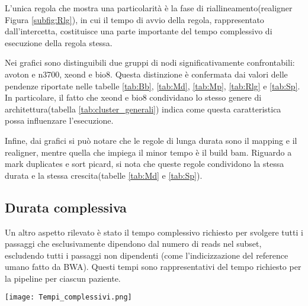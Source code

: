 L'unica regola che mostra una particolarità è la fase di riallineamento(realigner Figura \ref{subfig:Rlg}), in cui il tempo di avvio della regola, rappresentato dall'intercetta, costituisce una parte importante del tempo complessivo di esecuzione della regola stessa. 

Nei grafici sono distinguibili due gruppi di nodi significativamente confrontabili: avoton e n3700, xeond e bio8.
Questa distinzione è confermata dai valori delle pendenze riportate nelle tabelle \ref{tab:Bb}, \ref{tab:Md}, \ref{tab:Mp}, \ref{tab:Rlg} e \ref{tab:Sp}.
In particolare, il fatto che xeond e bio8 condividano lo stesso genere di architettura(tabella \ref{tab:cluster_generali}) indica come questa caratteristica possa influenzare l'esecuzione.

Infine, dai grafici si può notare che le regole di lunga durata sono il mapping e il realigner, mentre quella che impiega il minor tempo è il build bam.
Riguardo a mark duplicates e sort picard, si nota che queste regole condividono la stessa durata e la stessa crescita(tabelle \ref{tab:Md} e \ref{tab:Sp}).    


\subsection{Durata complessiva}
Un altro aspetto rilevato è stato il tempo complessivo richiesto per svolgere tutti i passaggi che esclusivamente dipendono dal numero di reads nel subset, escludendo tutti i passaggi non dipendenti (come l'indicizzazione del reference umano fatto da BWA).
Questi tempi sono rappresentativi del tempo richiesto per la pipeline per ciascun paziente. 

\begin{table}[H]
  \begin{minipage}[b]{0.4\linewidth}
	\centering
	\texttt{[image: Tempi\_complessivi.png]}	
	\label{fig:Ttot}
  \end{minipage}
  \hfill  
  \begin{varwidth}[b]{0.4\linewidth}
    \centering
    \caption{Pendenze per i tempi complessivi.}
    \label{tab:Ttot}
  \end{varwidth}%
\end{table}

